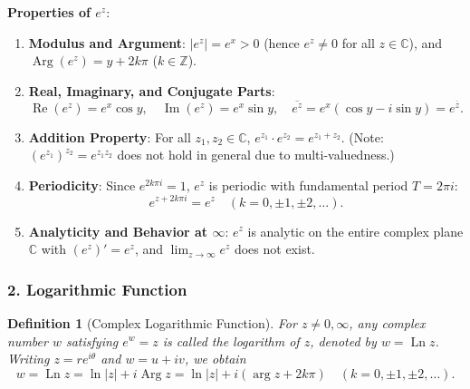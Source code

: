 \documentclass[11pt,a4paper]{article}
\theoremstyle{definitionbreak}
\newtheorem{definition}{Definition}
\theoremstyle{examplebreak}
\theoremstyle{plain}
\begin{document}
\textbf{Properties of $e^z$}:
\begin{enumerate}
    \item \textbf{Modulus and Argument}: $|e^z| = e^x > 0$ (hence $e^z \neq 0$ for all $z \in \mathbb{C}$), and $\operatorname{Arg}(e^z) = y + 2k\pi$ ($k \in \mathbb{Z}$).
    \item \textbf{Real, Imaginary, and Conjugate Parts}:
    \[
        \operatorname{Re}(e^z) = e^x \cos y, \quad \operatorname{Im}(e^z) = e^x \sin y, \quad \overline{e^z} = e^x(\cos y - i\sin y) = e^{\overline{z}}.
    \]
    \item \textbf{Addition Property}: For all $z_1, z_2 \in \mathbb{C}$, $e^{z_1} \cdot e^{z_2} = e^{z_1 + z_2}$. (Note: $(e^{z_1})^{z_2} = e^{z_1 z_2}$ does not hold in general due to multi-valuedness.)
    \item \textbf{Periodicity}: Since $e^{2k\pi i} = 1$, $e^z$ is periodic with fundamental period $T = 2\pi i$:
    \[
        e^{z + 2k\pi i} = e^z \quad (k = 0, \pm 1, \pm 2, \dots).
    \]
    \item \textbf{Analyticity and Behavior at $\infty$}: $e^z$ is analytic on the entire complex plane $\mathbb{C}$ with $(e^z)' = e^z$, and $\lim_{z \to \infty} e^z$ does not exist.
\end{enumerate}

\subsubsection{2. Logarithmic Function}

\begin{definition}[Complex Logarithmic Function]
For $z \neq 0, \infty$, any complex number $w$ satisfying $e^w = z$ is called the logarithm of $z$, denoted by $w = \operatorname{Ln} z$. Writing $z = r e^{i\theta}$ and $w = u + iv$, we obtain
\[
    w = \operatorname{Ln} z = \ln|z| + i\operatorname{Arg} z = \ln|z| + i(\arg z + 2k\pi) \quad (k = 0, \pm 1, \pm 2, \dots).
\]
\end{definition}
\end{document}
